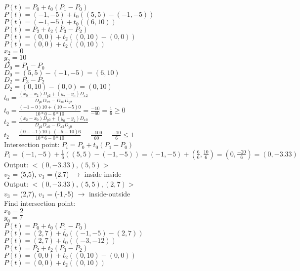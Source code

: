 \documentclass[12pt]{article}
\begin{document}
\begin{enumerate}
	$P(t) = P_0 + t_0(P_1 - P_0)$ \\
	$P(t) = (-1,-5) + t_0((5,5) - (-1,-5))$ \\
	$P(t) = (-1,-5) + t_0((6,10))$ \\ 	
	$P(t) = P_2 + t_2(P_3 - P_2)$ \\
	$P(t) = (0,0) + t_2((0,10) - (0,0))$ \\
	$P(t) = (0,0) + t_2((0,10))$ \\ 
	
	$x_2 = 0$ \\
	$y_2 = 10$ \\
	
	$D_0 = P_1 - P_0$ \\
	$D_0 = (5,5) - (-1,-5) = (6,10)$ \\ 
	
	$D_2 = P_3 - P_2$ \\
	$D_2 = (0,10) - (0,0) = (0,10)$ \\ 
		
	$t_0 = \frac{(x_0 - x_2)D_{y2} + (y_2 - y_0)D_{x2}}{D_{y0}D_{x2} - D_{x0}D_{y2}}$ \\ 
	$t_0 = \frac{(-1 - 0)10 + (10 - -5)0}{10 * 0 - 6*10} = \frac{-10}{-60} = \frac{1}{6} \geq 0$  \\ 
	
	$t_2 = \frac{(x_2 - x_0)D_{y0} + (y_0 - y_2)D_{x0}}{D_{y2}D_{x0} - D_{x2}D_{y0}}$ \\ 
	$t_2 = \frac{(0 - -1)10 + (-5 - 10)6}{10*6 - 0*10} = \frac{-100}{60} = \frac{-10}{6} \leq 1$ \\ 
	
	Intersection point:
	$P_i = P_0 + t_0(P_1 - P_0)$ \\
	$P_i = (-1,-5) + \frac{1}{6}((5,5) - (-1,-5)) = (-1,-5) + (\frac{6}{6},\frac{10}{6}) = (0,\frac{-20}{6}) = (0,-3.33)$ \\
	
Output: $<(0,-3.33), (5,5)>$ \\

$v_{2}$ = (5,5), $v_{3}$ = (2,7) $\rightarrow$ inside-inside \\
Output: $<(0,-3.33), (5,5), (2,7)>$ \\

$v_{3}$ = (2,7), $v_{1}$ = (-1,-5) $\rightarrow$ inside-outside \\
Find intersection point:  \\
	$x_0 = 2$ \\
	$y_0 = 7$ \\ 

	$P(t) = P_0 + t_0(P_1 - P_0)$ \\
	$P(t) = (2,7) + t_0((-1,-5) - (2,7))$ \\
	$P(t) = (2,7) + t_0((-3,-12))$ \\ 
	$P(t) = P_2 + t_2(P_3 - P_2)$ \\
	$P(t) = (0,0) + t_2((0,10) - (0,0))$ \\
	$P(t) = (0,0) + t_2((0,10))$ \\ 
	

\end{enumerate}
\end{document}
